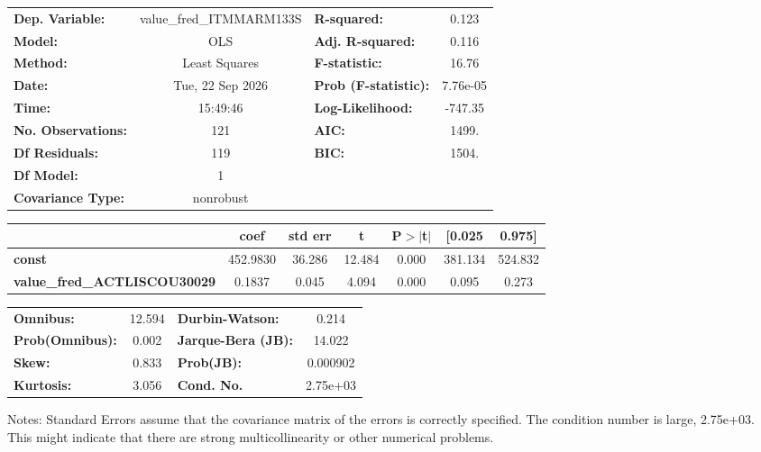 \begin{center}
\begin{tabular}{lclc}
\toprule
\textbf{Dep. Variable:}              & value\_fred\_ITMMARM133S & \textbf{  R-squared:         } &     0.123   \\
\textbf{Model:}                      &           OLS            & \textbf{  Adj. R-squared:    } &     0.116   \\
\textbf{Method:}                     &      Least Squares       & \textbf{  F-statistic:       } &     16.76   \\
\textbf{Date:}                       &     Tue, 22 Sep 2026     & \textbf{  Prob (F-statistic):} &  7.76e-05   \\
\textbf{Time:}                       &         15:49:46         & \textbf{  Log-Likelihood:    } &   -747.35   \\
\textbf{No. Observations:}           &             121          & \textbf{  AIC:               } &     1499.   \\
\textbf{Df Residuals:}               &             119          & \textbf{  BIC:               } &     1504.   \\
\textbf{Df Model:}                   &               1          & \textbf{                     } &             \\
\textbf{Covariance Type:}            &        nonrobust         & \textbf{                     } &             \\
\bottomrule
\end{tabular}
\begin{tabular}{lcccccc}
                                     & \textbf{coef} & \textbf{std err} & \textbf{t} & \textbf{P$> |$t$|$} & \textbf{[0.025} & \textbf{0.975]}  \\
\midrule
\textbf{const}                       &     452.9830  &       36.286     &    12.484  &         0.000        &      381.134    &      524.832     \\
\textbf{value\_fred\_ACTLISCOU30029} &       0.1837  &        0.045     &     4.094  &         0.000        &        0.095    &        0.273     \\
\bottomrule
\end{tabular}
\begin{tabular}{lclc}
\textbf{Omnibus:}       & 12.594 & \textbf{  Durbin-Watson:     } &    0.214  \\
\textbf{Prob(Omnibus):} &  0.002 & \textbf{  Jarque-Bera (JB):  } &   14.022  \\
\textbf{Skew:}          &  0.833 & \textbf{  Prob(JB):          } & 0.000902  \\
\textbf{Kurtosis:}      &  3.056 & \textbf{  Cond. No.          } & 2.75e+03  \\
\bottomrule
\end{tabular}
\end{center}

Notes: \newline
 [1] Standard Errors assume that the covariance matrix of the errors is correctly specified. \newline
 [2] The condition number is large, 2.75e+03. This might indicate that there are \newline
 strong multicollinearity or other numerical problems.